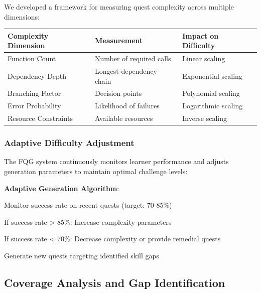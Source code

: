 We developed a framework for measuring quest complexity across multiple dimensions:

\begin{center}
\begin{tabular}{@{}lll@{}}
\toprule
\textbf{Complexity Dimension} & \textbf{Measurement} & \textbf{Impact on Difficulty} \\
\midrule
Function Count & Number of required calls & Linear scaling \\
Dependency Depth & Longest dependency chain & Exponential scaling \\
Branching Factor & Decision points & Polynomial scaling \\
Error Probability & Likelihood of failures & Logarithmic scaling \\
Resource Constraints & Available resources & Inverse scaling \\
\bottomrule
\end{tabular}
\end{center}

\subsubsection*{Adaptive Difficulty Adjustment}

The FQG system continuously monitors learner performance and adjusts generation parameters to maintain optimal challenge levels:

\begin{alertbox}
\textbf{Adaptive Generation Algorithm}:
\begin{compactlist}
    \item Monitor success rate on recent quests (target: 70-85\%)
    \item If success rate > 85\%: Increase complexity parameters
    \item If success rate < 70\%: Decrease complexity or provide remedial quests
    \item Generate new quests targeting identified skill gaps
\end{compactlist}
\end{alertbox}

\subsection*{Coverage Analysis and Gap Identification}


